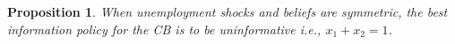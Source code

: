 \documentclass[12pt,a4paper]{article}
\newtheorem{proposition}{Proposition}
\begin{document}
\begin{proposition}
    When unemployment shocks and beliefs are symmetric, the best information policy for the CB is to be uninformative i.e., $x_1+x_2=1$.
\end{proposition}
\end{document}
